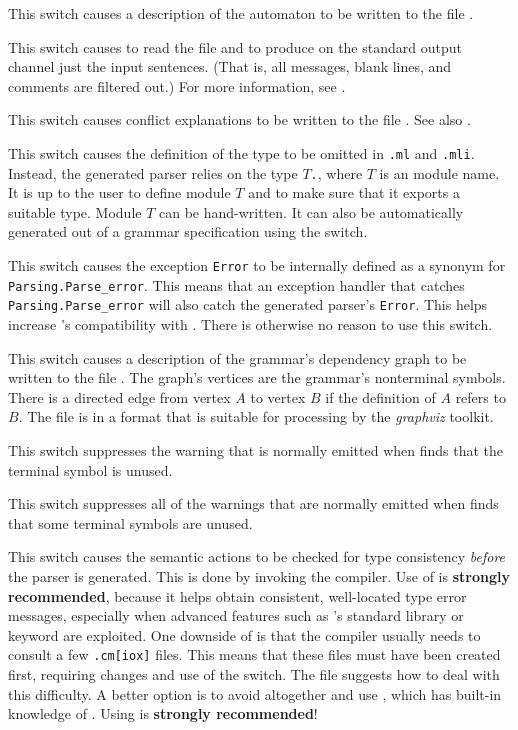 \documentclass[onecolumn,11pt,nocopyrightspace,preprint]{sigplanconf}
\begin{document}
\docswitch{\odump} This switch causes a description of the automaton
to be written to the file \automaton.

 This switch causes \menhir to
read the \messages file  and to produce on the standard output
channel just the input sentences. (That is, all messages, blank lines, and
comments are filtered out.) For more information, see .

\docswitch{\oexplain} This switch causes conflict explanations to be
written  to the file \conflicts. See also .

 This switch causes the definition of
the \token type to be omitted in \texttt{.ml} and
\texttt{.mli}. Instead, the generated parser relies on
the type $T$\texttt{.}\token, where $T$ is an \ocaml module name. It is up to
the user to define module $T$ and to make sure that it exports a suitable
\token type. Module $T$ can be hand-written. It can also be automatically generated
out of a grammar specification using the \oonlytokens switch.

\docswitch{\ofixedexc} This switch causes the exception \texttt{Error} to be
internally defined as a synonym for \texttt{Parsing.Parse\_error}. This means
that an exception handler that catches \texttt{Parsing.Parse\_error} will also
catch the generated parser's \texttt{Error}. This helps increase \menhir's
compatibility with \ocamlyacc. There is otherwise no reason to use this switch.

\docswitch{\ograph} This switch causes a description of the grammar's
dependency graph to be written to the file \dott. The graph's
vertices are the grammar's nonterminal symbols. There is a directed edge from
vertex $A$ to vertex $B$ if the definition of $A$ refers to $B$. The file is
in a format that is suitable for processing by the \emph{graphviz} toolkit.

 This switch suppresses the warning that
is normally emitted when \menhir finds that the terminal symbol  is
unused.

\docswitch{\oignoreall} This switch suppresses all of the warnings that are
normally emitted when \menhir finds that some terminal symbols are unused.

\docswitch{\oinfer} This switch causes the semantic actions to be checked for
type consistency \emph{before} the parser is generated. This is done by
invoking the \ocaml compiler. Use of \oinfer is \textbf{strongly recommended},
because it helps obtain consistent, well-located type error messages,
especially when advanced features such as \menhir's standard library or
\dinline keyword are exploited. One downside of \oinfer is that the \ocaml
compiler usually needs to consult a few \texttt{.cm[iox]} files. This means
that these files must have been created first, requiring \Makefile changes and
use of the \odepend switch. The file  suggests
how to deal with this difficulty. A better option is to avoid \make altogether
and use \ocamlbuild, which has built-in knowledge of \menhir. Using
\ocamlbuild is \textbf{strongly recommended}!
\end{document}
